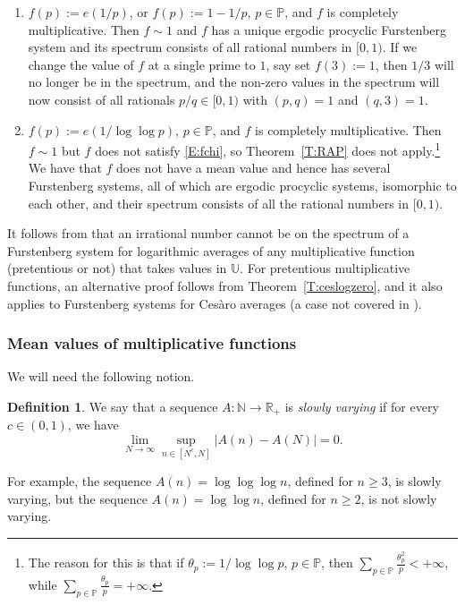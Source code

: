 \documentclass[11pt]{amsart}
\theoremstyle{definition}
\newtheorem{definition}{Definition}[section]
\newcommand{\N}{{\mathbb N}}
\renewcommand{\P}{{\mathbb P}}
\newcommand{\R}{{\mathbb R}}
\newcommand{\U}{{\mathbb U}}
\begin{document}
\begin{enumerate}
    \smallskip
	
	\item \label{vi} $f(p):=e(1/p)$, or $f(p):=1-1/p$, $p\in \P$, and $f$ is completely multiplicative. Then $f\sim 1$ and $f$  has a unique ergodic procyclic Furstenberg system and its spectrum consists of all rational numbers in $[0,1)$. If  we change the value of $f$ at a single prime to $1$, say set $f(3):=1$, then $1/3$ will no longer be in the spectrum, and the non-zero values in the spectrum  will now consist of all rationals  $p/q\in [0,1)$ with $(p,q)=1$ and $(q,3)=1$.
	
	\smallskip
	
	\item \label{vii}  $f(p):=e(1/ \log\log{p})$, $p\in \P$, and $f$ is completely multiplicative. Then $f\sim 1$ but $f$ does not satisfy \eqref{E:fchi}, so  Theorem~\ref{T:RAP} does not apply.\footnote{The reason for this is that if $\theta_p:=1/\log\log{p}$, $p\in \P$, then $\sum_{p\in\P}\frac{\theta_p^2}p<+\infty$, while $\sum_{p\in\P}\frac{\theta_p}p=+\infty$.}
	  We have  that $f$ does not have a mean value \cite[Corollary~2]{DD82}  and hence has several Furstenberg systems,   all of which are ergodic procyclic systems, isomorphic to each other, and their spectrum consists of all the rational numbers in $[0,1)$.
\end{enumerate}


It follows from  \cite[Theorem~1.5]{FH21}  that an irrational number cannot be on the spectrum of a  Furstenberg system for logarithmic averages of any multiplicative function (pretentious or not) that takes values in $\U$. For  pretentious multiplicative functions, an alternative proof follows from
Theorem~\ref{T:ceslogzero}, and it  also applies to Furstenberg systems for Ces\`aro averages (a case not covered in \cite{FH21}).

\subsubsection{Mean values of multiplicative functions}
We will need the following notion.
 \begin{definition}\label{D:slowgrow}
	We say that a sequence $A\colon \N\to \R_+$ is {\em slowly varying} if for every $c\in (0,1)$, we have
	$$
	\lim_{N\to\infty}  \sup_{n\in [N^c,N]}|A(n)-A(N)|=0.
	$$
\end{definition}
For example, the sequence $A(n)=\log\log\log{n}$, defined for $n\geq 3$, is slowly varying,
but the sequence $A(n)=\log\log{n}$, defined for $n\geq 2$, is not slowly varying.
\end{document}
